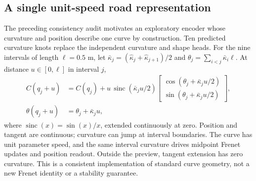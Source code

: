 \documentclass[preprint,12pt]{elsarticle}
\begin{document}
\subsection{A single unit-speed road representation}\label{sec:coupled}
The preceding consistency audit motivates an exploratory encoder whose curvature
and position describe one curve by construction. Ten predicted curvature knots
replace the independent curvature and shape heads. For the nine intervals of
length $\ell=0.5$ m, let $\bar\kappa_j=(\hat\kappa_j+\hat\kappa_{j+1})/2$ and
$\theta_j=\sum_{i<j}\bar\kappa_i\ell$. At distance $u\in[0,\ell]$ in interval $j$,
\begin{align}
 C(q_j+u)&=C(q_j)+u\,\operatorname{sinc}(\bar\kappa_j u/2)
 \begin{bmatrix}\cos(\theta_j+\bar\kappa_j u/2)\\
 \sin(\theta_j+\bar\kappa_j u/2)\end{bmatrix},\\
 \theta(q_j+u)&=\theta_j+\bar\kappa_j u,
\end{align}
where $\operatorname{sinc}(x)=\sin(x)/x$, extended continuously at zero.
Position and tangent are continuous; curvature can jump at interval boundaries.
The curve has unit parameter speed, and the same interval curvature drives
midpoint Frenet updates and position readout. Outside the preview, tangent
extension has zero curvature. This is a consistent implementation of standard
curve geometry, not a new Frenet identity or a stability guarantee.
\end{document}
